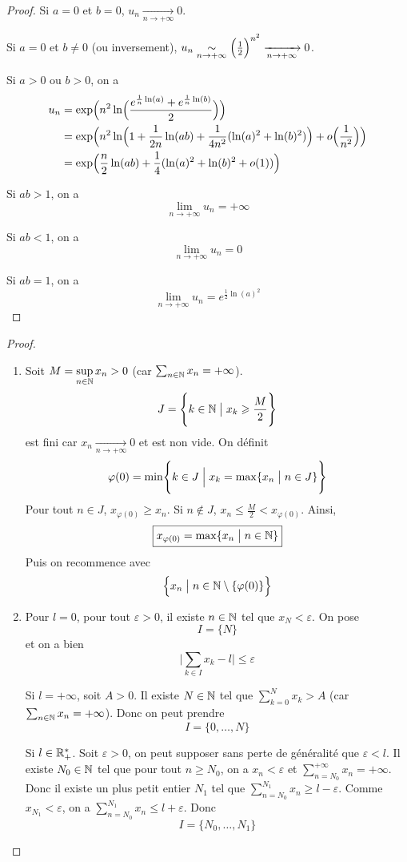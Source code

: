 \begin{proof}
	Si $a=0$ et $b=0$, $u_{n}\xrightarrow[n\to+\infty]{}0$.

	Si $a=0$ et $b\neq0$ (ou inversement), $u_{n}\underset{n\to+\infty}{\sim}\Bigl(\frac{1}{2}\Bigr)^{n^{2}}\xrightarrow[n\to+\infty]{}0$.

	Si $a>0$ ou $b>0$, on a
	\begin{align*}
		u_{n}
		&=\exp\Bigl(n^{2}\ln\Bigl(\frac{e^{\frac{1}{n}\ln(a)}+e^{\frac{1}{n}\ln(b)}}{2}\Bigr)\Bigr)\\
		&=\exp\Bigl(n^{2}\ln\Bigl(1+\frac{1}{2n}\ln(ab)+\frac{1}{4n^2}(\ln(a)^{2}+\ln(b)^{2})\Bigr)+o\Bigl(\frac{1}{n^{2}}\Bigr)\Bigr)\\
		&=\exp\Bigl(\frac{n}{2}\ln(ab)+\frac{1}{4}(\ln(a)^{2}+\ln(b)^{2}+o(1))\Bigr)
	\end{align*}

	Si $ab>1$, on a 
	$$\boxed{\lim\limits_{n\to+\infty} u_{n}=+\infty}$$
	
	Si $ab<1$, on a 
	$$\boxed{\lim\limits_{n\to+\infty} u_{n}=0}$$

	Si $ab=1$, on a 
	$$\boxed{\lim\limits_{n\to+\infty} u_{n}=e^{\frac{1}{2}\ln(a)^{2}}}$$
\end{proof}

\begin{proof}
	\phantom{}
	\begin{enumerate}
		\item Soit $M=\sup\limits_{n\in\mathbb{N}}x_{n}>0$ (car $\sum_{n\in\mathbb{N}}x_{n}=+\infty$). 
		$$J=\Biggl\{k\in\mathbb{N}\bigm| x_{k}\geqslant\frac{M}{2}\Biggr\}$$
		est fini car $x_{n}\xrightarrow[n\to+\infty]{}0$ et est non vide. On définit 
		$$\varphi(0)=\min\Biggl\{k\in J\Bigm| x_{k}=\max\{x_{n}\bigm|n\in J\}\Biggr\}$$
		Pour tout $n\in J$, $x_{\varphi(0)}\geqslant x_{n}$. Si $n\notin J$, $x_{n}\leqslant\frac{M}{2}<x_{\varphi(0)}$. Ainsi, 
		$$\boxed{x_{\varphi(0)}=\max\{x_{n}\bigm| n\in\mathbb{N}\}}$$
		Puis on recommence avec 
		$$\Bigl\{x_{n}\bigm| n\in\mathbb{N}\setminus\{\varphi(0)\}\Bigr\}$$

		\item Pour $l=0$, pour tout $\varepsilon>0$, il existe $n\in\mathbb{N}$ tel que $x_{N}<\varepsilon$. On pose 
		$$\boxed{I=\{N\}}$$
		et on a bien 
		$$\Biggl\lvert\sum_{k\in I}x_{k}-l\Biggr\rvert\leqslant\varepsilon$$

		Si $l=+\infty$, soit $A>0$. Il existe $N\in\mathbb{N}$ tel que $\sum_{k=0}^{N}x_{k}>A$ (car $\sum_{n\in\mathbb{N}}x_{n}=+\infty$). Donc on peut prendre 
		$$\boxed{I=\{0,\dots,N\}}$$

		Si $l\in\mathbb{R}_{+}^{*}$. Soit $\varepsilon>0$, on peut supposer sans perte de généralité que $\varepsilon<l$. Il existe $N_{0}\in\mathbb{N}$ tel que pour tout $n\geqslant N_{0}$, on a $x_{n}<\varepsilon$ et $\sum_{n=N_{0}}^{+\infty}x_{n}=+\infty$. Donc il existe un plus petit entier $N_{1}$ tel que $\sum_{n=N_{0}}^{N_{1}}x_{n}\geqslant l-\varepsilon$. Comme $x_{N_{1}}<\varepsilon$, on a $\sum_{n=N_{0}}^{N_{1}}x_{n}\leqslant l+\varepsilon$. Donc 
		$$\boxed{I=\{N_{0},\dots,N_{1}\}}$$
	\end{enumerate}
\end{proof}

